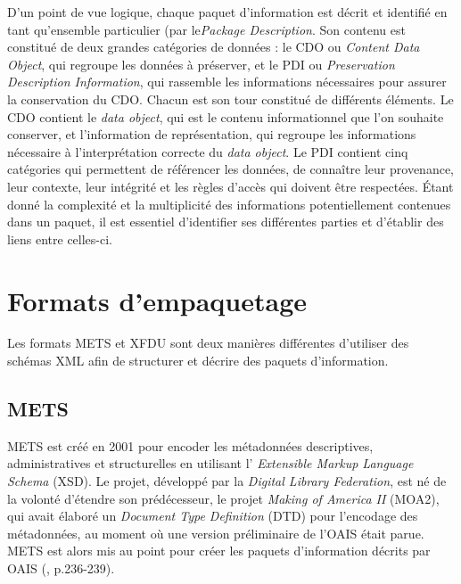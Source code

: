 \documentclass[12pt,a4paper]{article} %
\begin{document}
D'un point de vue logique, chaque paquet d'information est décrit et identifié en tant qu'ensemble particulier (par le\textit{Package Description}. Son contenu est constitué de deux grandes catégories de données : le CDO ou \textit{Content Data Object}, qui regroupe les données à préserver, et le PDI ou \textit{Preservation Description Information}, qui rassemble les informations nécessaires pour assurer la conservation du CDO. Chacun est son tour constitué de différents éléments. Le CDO contient le \textit{data object}, qui est le contenu informationnel que l'on souhaite conserver, et l'information de représentation, qui regroupe les informations nécessaire à l'interprétation correcte du \textit{data object}. Le PDI contient cinq catégories qui permettent de référencer les données, de connaître leur provenance, leur contexte, leur intégrité et les règles d'accès qui doivent être respectées. Étant donné la complexité et la multiplicité des informations potentiellement contenues dans un paquet, il est essentiel d'identifier ses différentes parties et d'établir des liens entre celles-ci. 


\section{Formats d'empaquetage}
Les formats METS et XFDU sont deux manières différentes d'utiliser des schémas XML afin de structurer et décrire des paquets d'information. 
\subsection{METS}
METS est créé en 2001 pour encoder les métadonnées descriptives, administratives et structurelles en utilisant l'\textit{ Extensible Markup Language Schema} (XSD). Le projet, développé par la \textit{Digital Library Federation}, est né de la volonté d'étendre son prédécesseur, le projet \textit {Making of America II} (MOA2), qui avait élaboré un \textit{Document Type Definition} (DTD) pour l'encodage des métadonnées, au moment où une version préliminaire de l'OAIS était parue. METS est alors mis au point pour créer les paquets d'information décrits par OAIS (\cite{cantara_mets_2005}, p.236-239). 
\end{document}
